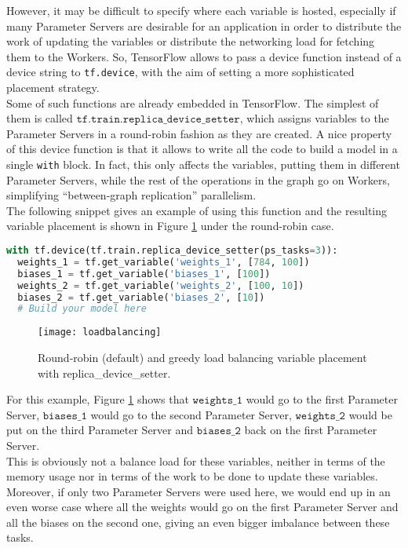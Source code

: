 However, it may be difficult to specify where each variable is hosted, especially if many Parameter Servers are desirable for an application in order to distribute the work of updating the variables or distribute the networking load for fetching them to the Workers.
So, TensorFlow allows to pass a device function instead of a device string to \texttt{tf.device}, with the aim of setting a more sophisticated placement strategy.\\[-0.2cm]

Some of such functions are already embedded in TensorFlow.
The simplest of them is called $\texttt{tf.train.replica\_device\_setter}$, which assigns variables to the Parameter Servers in a round-robin fashion as they are created.
A nice property of this device function is that it allows to write all the code to build a model in a single \texttt{with} block.
In fact, this only affects the variables, putting them in different Parameter Servers, while the rest of the operations in the graph go on Workers, simplifying ``between-graph replication'' parallelism.\\[-0.2cm]

The following snippet gives an example of using this function and the resulting variable placement is shown in Figure \ref{fig:loadbalancing-plot} under the round-robin case.
\begin{lstlisting}[label=listing:round-robin, language=Python, caption=Default variable placement with \texttt{replica\_device\_setter}.]
with tf.device(tf.train.replica_device_setter(ps_tasks=3)):
  weights_1 = tf.get_variable('weights_1', [784, 100])
  biases_1 = tf.get_variable('biases_1', [100])
  weights_2 = tf.get_variable('weights_2', [100, 10])
  biases_2 = tf.get_variable('biases_2', [10])
  # Build your model here
\end{lstlisting}
\begin{figure}[H]
  \centering
  \texttt{[image: loadbalancing]}
  \vspace{-0.5cm}
  \caption{Round-robin (default) and greedy load balancing variable placement with replica\_device\_setter.} 
  \label{fig:loadbalancing-plot}
\end{figure}
\vspace{-0.3cm}
For this example, Figure \ref{fig:loadbalancing-plot} shows that $\texttt{weights\_1}$ would go to the first Parameter Server, $\texttt{biases\_1}$ would go to the second Parameter Server, $\texttt{weights\_2}$ would be put on the third Parameter Server and $\texttt{biases\_2}$ back on the first Parameter Server.\\
This is obviously not a balance load for these variables, neither in terms of the memory usage nor in terms of the work to be done to update these variables.\\
Moreover, if only two Parameter Servers were used here, we would end up in an even worse case where all the weights would go on the first Parameter Server and all the biases on the second one, giving an even bigger imbalance between these tasks.\\[-0.2cm]

